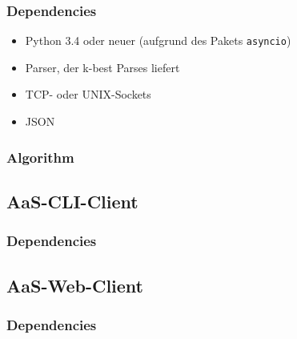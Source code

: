 \documentclass{scrartcl}
\begin{document}
\subsubsection{Dependencies}
\label{ssub:Server-Dependencies}

    \begin{itemize}
            \vspace{10pt}
        \item Python 3.4 oder neuer (aufgrund des Pakets \texttt{asyncio})
            \vspace{10pt}
        \item Parser, der k-best Parses liefert
            \vspace{10pt}
        \item TCP- oder UNIX-Sockets
        	\vspace{10pt}
        \item JSON
    \end{itemize}

\subsubsection{Algorithm}
\label{ssub:Algorithm}

\subsection{AaS-CLI-Client}
\label{sub:AaS-CLI-Client}

\subsubsection{Dependencies}
\label{ssub:CLI-Client-Dependencies}

\subsection{AaS-Web-Client}
\label{sub:AaS-Web-Client}

\subsubsection{Dependencies}
\label{ssub:Web-Client-Dependencies}
\end{document}
